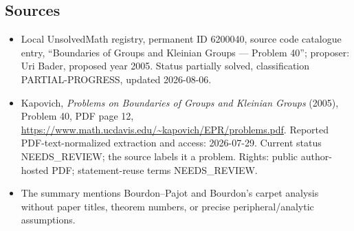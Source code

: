 \documentclass[11pt]{article}
\begin{document}
\subsection{Sources}
\begin{itemize}
\item Local UnsolvedMath registry, permanent ID 6200040, source code catalogue entry, ``Boundaries of Groups and Kleinian Groups --- Problem 40''; proposer: Uri Bader, proposed year 2005. Status partially solved, classification PARTIAL-PROGRESS, updated 2026-08-06.
\item Kapovich, \emph{Problems on Boundaries of Groups and Kleinian Groups} (2005), Problem 40, PDF page 12, \url{https://www.math.ucdavis.edu/~kapovich/EPR/problems.pdf}. Reported PDF-text-normalized extraction and access: 2026-07-29. Current status NEEDS\_REVIEW; the source labels it a problem. Rights: public author-hosted PDF; statement-reuse terms NEEDS\_REVIEW.
\item The summary mentions Bourdon--Pajot and Bourdon's carpet analysis without paper titles, theorem numbers, or precise peripheral/analytic assumptions.
\end{itemize}
\end{document}
